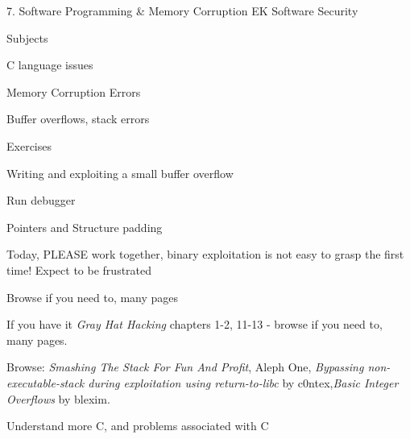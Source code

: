 \documentclass[Screen16to9,17pt]{foils}
\begin{document}
\mytitlepage
{7. Software Programming \& Memory Corruption}
{EK  Software Security}


\begin{list1}
\item Subjects
\begin{list2}
\item C language issues
\item Memory Corruption Errors
\item Buffer overflows, stack errors
\end{list2}
\item Exercises
\begin{list2}
\item Writing and exploiting a small buffer overflow
\item Run debugger
\item Pointers and Structure padding
\end{list2}
\end{list1}

Today, PLEASE work together, binary exploitation is not easy to grasp the first time! Expect to be frustrated


\centerline{Browse if you need to, many pages}

\begin{list1}
\item If you have it \emph{Gray Hat Hacking} chapters 1-2, 11-13 - browse if you need to, many pages.
\item Browse: \emph{Smashing The Stack For Fun And Profit}, Aleph One, \emph{Bypassing non-executable-stack during exploitation using return-to-libc} by c0ntex,\emph{Basic Integer Overflows} by blexim.


\end{list1}



\begin{list1}
\item Understand more C, and problems associated with C
\end{list1}


\end{document}
